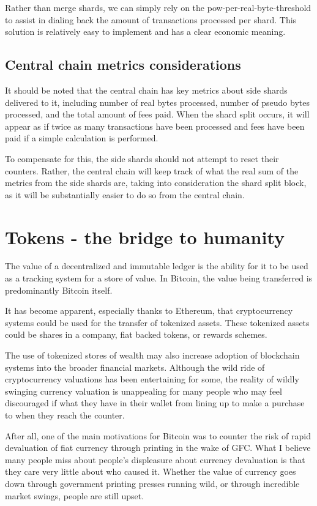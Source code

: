 \documentclass[a4paper,12pt]{article}
\begin{document}
Rather than merge shards, we can simply rely on the \gls{pow-per-real-byte-threshold} to assist in dialing back the amount of transactions processed per shard.  This solution is relatively easy to implement and has a clear economic meaning. 

\subsection{Central chain metrics considerations}
It should be noted that the central chain has key metrics about side shards delivered to it, including number of real bytes processed, number of pseudo bytes processed, and the total amount of fees paid. When the shard split occurs, it will appear as if twice as many transactions have been processed and fees have been paid if a simple calculation is performed. 

To compensate for this, the side shards should not attempt to reset their counters. Rather, the central chain will keep track of what the real sum of the metrics from the side shards are, taking into consideration the shard split block, as it will be substantially easier to do so from the central chain. 




\section{Tokens - the bridge to humanity}

The value of a decentralized and immutable ledger is the ability for it to be used as a tracking system for a store of value. In Bitcoin, the value being transferred is predominantly Bitcoin itself. 

It has become apparent, especially thanks to Ethereum, that cryptocurrency systems could be used for the transfer of tokenized assets. These tokenized assets could be shares in a company, fiat backed tokens, or rewards schemes. 

The use of tokenized stores of wealth may also increase adoption of blockchain systems into the broader financial markets. Although the wild ride of cryptocurrency valuations has been entertaining for some, the reality of wildly swinging currency valuation is unappealing for many people who may feel discouraged if what they have in their wallet  from lining up to make a purchase to when they reach the counter.

After all, one of the main motivations for Bitcoin was to counter the risk of rapid devaluation of fiat currency through printing in the wake of GFC. What I believe many people miss about people's displeasure about currency devaluation is that they care very little about who caused it. Whether the value of currency goes down through government printing presses running wild, or through incredible market swings, people are still upset. 
\end{document}
